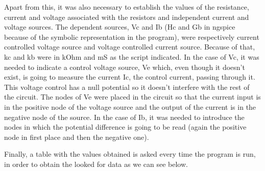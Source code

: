 \par Apart from this, it was also necessary to establish the values of the resistance, current and voltage associated with the resistors and independent current and voltage sources. The dependent sources, Vc and Ib (Hc and Gb in ngspice because of the symbolic representation in the program), were respectively current controlled voltage source and voltage controlled current source. Because of that, kc and kb were in kOhm and mS as the script indicated. In the case of Vc, it was needed to indicate a control voltage source, Ve which, even though it doesn't exist, is going to measure the current Ic, the control current, passing through it. This voltage control has a null potential so it doesn't interfere with the rest of the circuit. The nodes of Ve were placed in the circuit so that the current input is in the positive node of the voltage source and the output of the current is in the negative node of the source.  In the case of Ib, it was needed to introduce the nodes in which the potential difference is going to be read (again the positive node in first place and then the negative one).

\par \noindent Finally, a table with the values obtained is asked every time the program is run, in order to obtain the looked for data as we can see below. 
\vspace{5mm}
\begin{table}[H]
\centering
\begin{tabularx}{0.8\textwidth} {
  | >{\raggedright\arraybackslash}X
  | >{\raggedleft\arraybackslash}X | }
 \hline

\end{tabularx}
\end{table}




